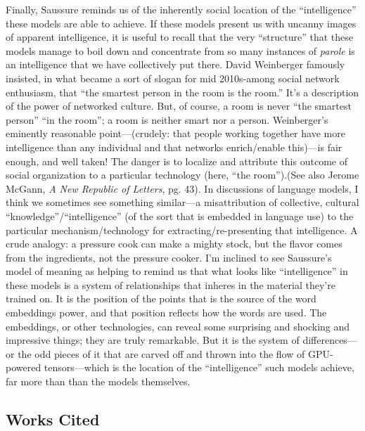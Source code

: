 \documentclass[
  12pt,
]{article}
\begin{document}
Finally, Saussure reminds us of the inherently social location of the
``intelligence'' these models are able to achieve. If these models
present us with uncanny images of apparent intelligence, it is useful to
recall that the very ``structure'' that these models manage to boil down
and concentrate from so many instances of \emph{parole} is an
intelligence that we have collectively put there. David Weinberger
famously insisted, in what became a sort of slogan for mid 2010s-among
social network enthusiasm, that ``the smartest person in the room is the
room.'' It's a description of the power of networked culture. But, of
course, a room is never ``the smartest person'' ``in the room''; a room
is neither smart nor a person. Weinberger's eminently reasonable
point---(crudely: that people working together have more intelligence
than any individual and that networks enrich/enable this)---is fair
enough, and well taken! The danger is to localize and attribute this
outcome of social organization to a particular technology (here, ``the
room'').{(See also Jerome McGann, \emph{A New Republic of Letters}, pg.
43).} In discussions of language models, I think we sometimes see
something similar---a misattribution of collective, cultural
``knowledge''/``intelligence'' (of the sort that is embedded in language
use) to the particular mechanism/technology for extracting/re-presenting
that intelligence. A crude analogy: a pressure cook can make a mighty
stock, but the flavor comes from the ingredients, not the pressure
cooker. I'm inclined to see Saussure's model of meaning as helping to
remind us that what looks like ``intelligence'' in these models is a
system of relationships that inheres in the material they're trained on.
It is the position of the points that is the source of the word
embeddings power, and that position reflects how the words are used. The
embeddings, or other technologies, can reveal some surprising and
shocking and impressive things; they are truly remarkable. But it is the
system of differences---or the odd pieces of it that are carved off and
thrown into the flow of GPU-powered tensors---which is the location of
the ``intelligence'' such models achieve, far more than than the models
themselves.

\hypertarget{works-cited}{%
\subsection*{Works Cited}\label{works-cited}}
\end{document}
